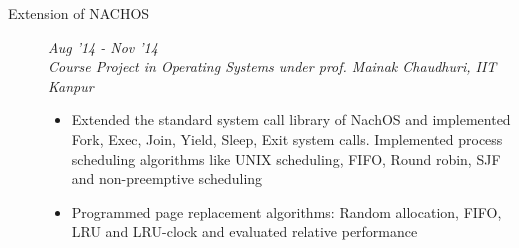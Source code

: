 \documentclass[9pt]{article}
\newenvironment{changemargin}[2]{%
  \begin{list}{}{%
    \setlength{\topsep}{0pt}%
    \setlength{\leftmargin}{#1}%
    \setlength{\rightmargin}{#2}%
    \setlength{\listparindent}{\parindent}%
    \setlength{\itemindent}{\parindent}%
    \setlength{\parsep}{\parskip}%
  }%
  \item[]}{\end{list}
}
\newenvironment{body} {
	\vspace*{-16pt}
	\begin{changemargin}{-0.6in}{-0.65in}
  }	
	{\end{changemargin}
}
\begin{document}
\begin{body}
\begin{description}
	\item[\normalsize{Extension of NACHOS}]  \hfill \textit{Aug '14 - Nov '14} \\
	\textit{Course Project in Operating Systems under prof. Mainak Chaudhuri, IIT Kanpur}
	\begin{itemize}
	 \item Extended the standard system call library of NachOS and implemented Fork, Exec, Join, Yield, Sleep, Exit system calls. Implemented process scheduling algorithms like UNIX scheduling, FIFO, Round robin, SJF and non-preemptive scheduling
	 \item Programmed page replacement algorithms: Random allocation, FIFO, LRU and LRU-clock and evaluated relative performance
	\end{itemize}
	

	 
 

\end{description}
\end{body}
\end{document}
